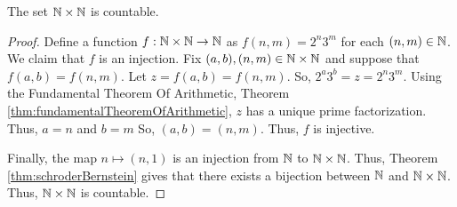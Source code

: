 \guard








\begin{prop}
\label{prop:naturalsCrossNaturalsisCountable}
  The set $\mathbb{N}\times\mathbb{N}$ is countable.
\end{prop}
\begin{proof}
  Define a function $f:\mathbb{N}\times\mathbb{N}\to\mathbb{N}$ as $f(n,m)=2^n3^m$ for each $(n,m)\in\mathbb{N}$.
  We claim that $f$ is an injection.
  Fix $(a,b),(n,m)\in\mathbb{N}\times\mathbb{N}$ and suppose that $f(a,b)=f(n,m)$.
  Let $z=f(a,b)=f(n,m)$.
  So, $2^a3^b = z = 2^n3^m$.
  Using the Fundamental Theorem Of Arithmetic, Theorem \ref{thm:fundamentalTheoremOfArithmetic}, $z$ has a unique prime factorization.
  Thus, $a=n$ and $b=m$
  So, $(a,b) = (n,m)$.
  Thus, $f$ is injective.

  Finally, the map $n\mapsto (n,1)$ is an injection from $\mathbb{N}$ to $\mathbb{N}\times\mathbb{N}$.
  Thus, Theorem \ref{thm:schroderBernstein} gives that there exists a bijection between $\mathbb{N}$ and $\mathbb{N}\times\mathbb{N}$.
  Thus, $\mathbb{N}\times\mathbb{N}$ is countable.
\end{proof}

